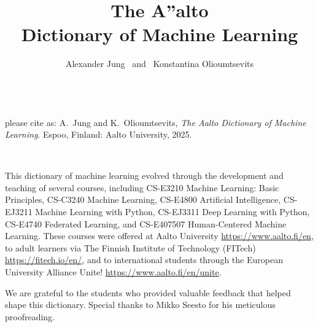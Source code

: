 \documentclass[journal,12pt,onecolumn]{article}
\begin{document}

\title {\vspace*{10mm}
	{\huge {\bf The {\fontsize{40}{48}\selectfont \textbf{\textsf{A\hspace*{-2mm}''}}}\hspace*{-4mm}alto \\ Dictionary of Machine Learning}}  \\[-5mm] 
}

\author{\hspace{-2mm}Alexander Jung \ and \ Konstantina Olioumtsevits \\[-2mm]%
}

\maketitle
	\begin{center}
		\\[10mm]
{\large	please cite as: A.\ Jung and K.\ Olioumtsevits, \textit{The Aalto Dictionary of Machine Learning}. Espoo, Finland: Aalto University, 2025.}
\end{center}

\newpage 
{}\

\noindent This dictionary of machine learning evolved through the development 
and teaching of several courses, including CS-E3210 Machine Learning: Basic Principles, 
CS-C3240 Machine Learning, CS-E4800 Artificial Intelligence, CS-EJ3211 Machine Learning with Python, 
CS-EJ3311 Deep Learning with Python, CS-E4740 Federated Learning, and 
CS-E407507 Human-Centered Machine Learning. These courses were offered at 
Aalto University \url{https://www.aalto.fi/en}, to adult learners via 
The Finnish Institute of Technology (FITech) \url{https://fitech.io/en/}, and to international 
students through the European University Alliance Unite! \url{https://www.aalto.fi/en/unite}.

\noindent We are grateful to the students who provided valuable feedback that helped shape this dictionary. 
Special thanks to Mikko Seesto for his meticulous proofreading.
\end{document}
